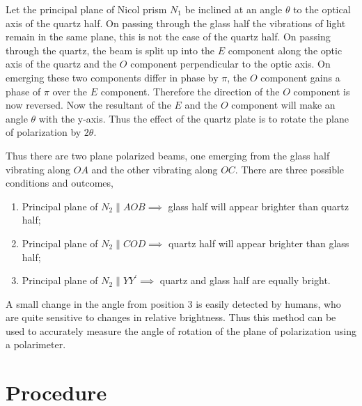\documentclass{dkpinto-report}
\begin{document}
Let the principal plane of Nicol prism $N_1$ be inclined at an angle $\theta$ to the optical axis of the quartz half. On passing through the glass half the vibrations of light remain in the same plane, this is not the case of the quartz half. On passing through the quartz, the beam is split up into the $E$ component along the optic axis of the quartz and the $O$ component perpendicular to the optic axis. On emerging these two components differ in phase by $\pi$, the $O$ component gains a phase of $\pi$ over the $E$ component. Therefore the direction of the $O$ component is now reversed. Now the resultant of the $E$ and the $O$ component will make an angle $\theta$ with the y-axis. Thus the effect of the quartz plate is to rotate the plane of polarization by $2\theta$.  

Thus there are two plane polarized beams, one emerging from the glass half vibrating along $OA$ and the other vibrating along $OC$. 
There are three possible conditions and outcomes,

\begin{enumerate}
\item Principal plane of $N_2 \parallel AOB \implies$ glass half will appear brighter than quartz half; 
\item Principal plane of $N_2 \parallel COD \implies$ quartz half will appear brighter than glass half;
\item Principal plane of $N_2 \parallel YY^{'} \implies$ quartz and glass half are equally bright.
\end{enumerate}

A small change in the angle from position 3 is easily detected by humans, who are quite sensitive to changes in relative brightness. Thus this method can be used to accurately measure the angle of rotation of the plane of polarization using a polarimeter.

\section{Procedure}
\end{document}
